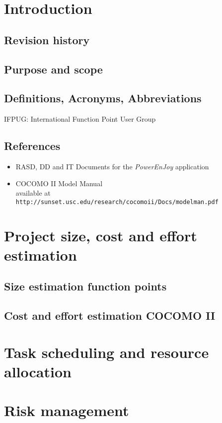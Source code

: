 \section{Introduction}
\subsection{Revision history}
\subsection{Purpose and scope}
\subsection{Definitions, Acronyms, Abbreviations}
IFPUG: International Function Point User Group
\subsection{References}
\begin{itemize}
       \item RASD, DD and IT Documents for the \textit{PowerEnJoy} application
       \item COCOMO II Model Manual\\
       available at \texttt{http://sunset.usc.edu/research/cocomoii/Docs/modelman.pdf}
\end{itemize}


\clearpage
\section{Project size, cost and effort estimation}
\subsection{Size estimation function points}


\clearpage
\subsection{Cost and effort estimation COCOMO II}


\clearpage
\section{Task scheduling and resource allocation}


\clearpage
\section{Risk management}


